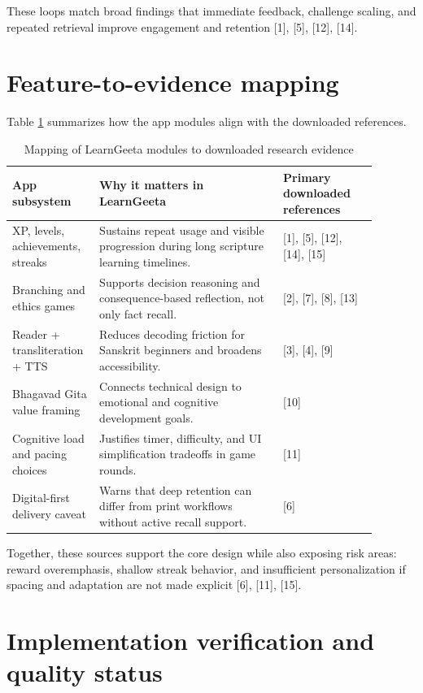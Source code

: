 \documentclass[conference]{IEEEtran}
\begin{document}
These loops match broad findings that immediate feedback, challenge scaling, and repeated retrieval improve engagement and retention [1], [5], [12], [14].

\section{Feature-to-evidence mapping}
Table \ref{tab:researchmap} summarizes how the app modules align with the downloaded references.

\begin{table}[t]
\caption{Mapping of LearnGeeta modules to downloaded research evidence}
\label{tab:researchmap}
\centering
\footnotesize
\begin{tabular}{|p{0.18\linewidth}|p{0.47\linewidth}|p{0.24\linewidth}|}
\hline
\textbf{App subsystem} & \textbf{Why it matters in LearnGeeta} & \textbf{Primary downloaded references} \\
\hline
XP, levels, achievements, streaks & Sustains repeat usage and visible progression during long scripture learning timelines. & [1], [5], [12], [14], [15] \\
\hline
Branching and ethics games & Supports decision reasoning and consequence-based reflection, not only fact recall. & [2], [7], [8], [13] \\
\hline
Reader + transliteration + TTS & Reduces decoding friction for Sanskrit beginners and broadens accessibility. & [3], [4], [9] \\
\hline
Bhagavad Gita value framing & Connects technical design to emotional and cognitive development goals. & [10] \\
\hline
Cognitive load and pacing choices & Justifies timer, difficulty, and UI simplification tradeoffs in game rounds. & [11] \\
\hline
Digital-first delivery caveat & Warns that deep retention can differ from print workflows without active recall support. & [6] \\
\hline
\end{tabular}
\end{table}

Together, these sources support the core design while also exposing risk areas: reward overemphasis, shallow streak behavior, and insufficient personalization if spacing and adaptation are not made explicit [6], [11], [15].

\section{Implementation verification and quality status}
\end{document}
